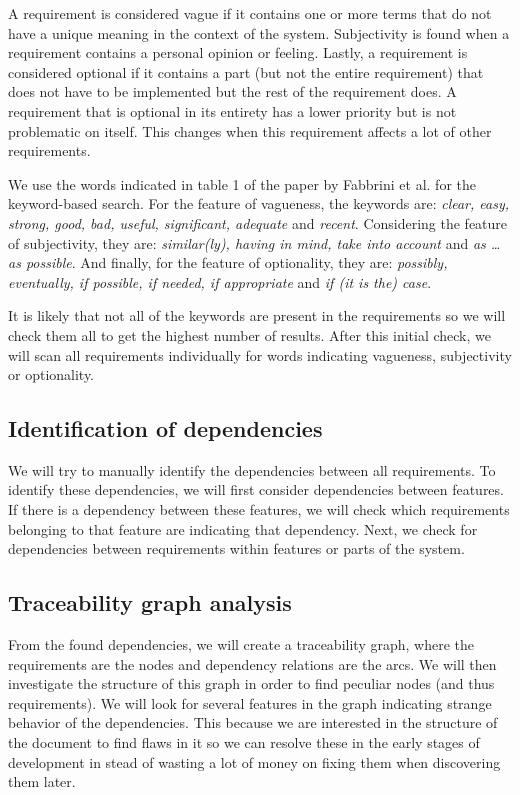 \documentclass[a4paper,twoside, twocolumn,11pt]{article}
\numberwithin{equation}{section}
\begin{document}
A requirement is considered vague if it contains one or more terms that do not have a unique meaning in the context of the system. Subjectivity is found when a requirement contains a personal opinion or feeling. Lastly, a requirement is considered optional if it contains a part (but not the entire requirement) that does not have to be implemented but the rest of the requirement does. A requirement that is optional in its entirety has a lower priority but is not problematic on itself. This changes when this requirement affects a lot of other requirements.

We use the words indicated in table 1 of the paper by Fabbrini et al. \cite{paper} for the keyword-based search. For the feature of vagueness, the keywords are: \textit{clear, easy, strong, good, bad, useful, significant, adequate} and \textit{recent}. Considering the feature of subjectivity, they are: \textit{similar(ly), having in mind, take into account} and \textit{ as \ldots as possible}. And finally, for the feature of optionality, they are: \textit{possibly, eventually, if possible, if needed, if appropriate} and \textit{if (it is the) case}.

It is likely that not all of the keywords are present in the requirements so we will check them all to get the highest number of results. After this initial check, we will scan all requirements individually for words indicating vagueness, subjectivity or optionality.

\subsection{Identification of dependencies}
We will try to manually identify the dependencies between all requirements. To identify these dependencies, we will first consider dependencies between features.  If there is a dependency between these features, we will check which requirements belonging to that feature are indicating that dependency. Next, we check for dependencies between requirements within features or parts of the system.%

\subsection{Traceability graph analysis}\label{2.3}
From the found dependencies, we will create a traceability graph, where the requirements are the nodes and dependency relations are the arcs. We will then investigate the structure of this graph in order to find peculiar nodes (and thus requirements). We will look for several features in the graph indicating strange behavior of the dependencies. This because we are interested in the structure of the document to find flaws in it so we can resolve these in the early stages of development in stead of wasting a lot of money on fixing them when discovering them later. 
\end{document}
